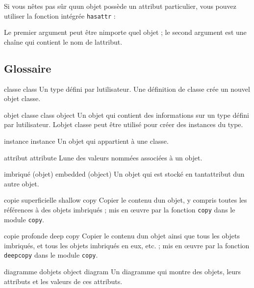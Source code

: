 Si vous n\textquotesingle êtes pas sûr qu\textquotesingle un objet
possède un attribut particulier, vous pouvez utiliser la fonction
intégrée \texttt{hasattr} :

\begin{Shaded}
\begin{Highlighting}[]
\OperatorTok{\textgreater{}\textgreater{}\textgreater{}} \NormalTok{)}
\OperatorTok{\textgreater{}\textgreater{}\textgreater{}} \NormalTok{)}
\end{Highlighting}
\end{Shaded}

Le premier argument peut être n\textquotesingle importe quel objet ; le
second argument est une chaîne qui contient le nom de
l\textquotesingle attribut.

\hypertarget{glossaire}{%
\subsection{Glossaire}\label{glossaire}}

classe class Un type défini par l\textquotesingle utilisateur. Une
définition de classe crée un nouvel objet classe.

objet classe class object Un objet qui contient des informations sur un
type défini par l\textquotesingle utilisateur. L\textquotesingle objet
classe peut être utilisé pour créer des instances du type.

instance instance Un objet qui appartient à une classe.

attribut attribute L\textquotesingle une des valeurs nommées associées à
un objet.

imbriqué (objet) embedded (object) Un objet qui est stocké en
tantattribut d\textquotesingle un autre objet.

copie superficielle shallow copy Copier le contenu d\textquotesingle un
objet, y compris toutes les références à des objets imbriqués ; mis en
œuvre par la fonction \texttt{copy} dans le module \texttt{copy}.

copie profonde deep copy Copier le contenu d\textquotesingle un objet
ainsi que tous les objets imbriqués, et tous les objets imbriqués en
eux, etc. ; mis en œuvre par la fonction \texttt{deepcopy} dans le
module \texttt{copy}.

diagramme d\textquotesingle objets object diagram Un diagramme qui
montre des objets, leurs attributs et les valeurs de ces attributs.

